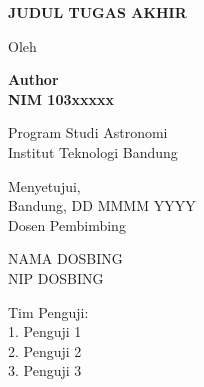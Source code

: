 \begin{center}
\textbf{\large{JUDUL TUGAS AKHIR}}\\

\vspace{2cm}

Oleh\\
\large{\textbf{Author\\
NIM 103xxxxx}\\

\vspace{1cm}

Program Studi Astronomi\\
Institut Teknologi Bandung}

\vspace{2cm}

Menyetujui,\\
Bandung, DD MMMM YYYY\\
Dosen Pembimbing\\

\vspace{2.5cm}

NAMA DOSBING \\
NIP DOSBING
\end{center}

\vspace{1cm}

\begin{flushleft}
Tim Penguji:\\
1. Penguji 1\\
2. Penguji 2\\
3. Penguji 3\\
\end{flushleft}



